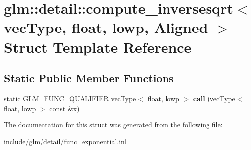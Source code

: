 \hypertarget{structglm_1_1detail_1_1compute__inversesqrt_3_01vecType_00_01float_00_01lowp_00_01Aligned_01_4}{}\section{glm\+:\+:detail\+:\+:compute\+\_\+inversesqrt$<$ vec\+Type, float, lowp, Aligned $>$ Struct Template Reference}
\label{structglm_1_1detail_1_1compute__inversesqrt_3_01vecType_00_01float_00_01lowp_00_01Aligned_01_4}
\subsection*{Static Public Member Functions}
\begin{DoxyCompactItemize}
\item 
\mbox{\label{structglm_1_1detail_1_1compute__inversesqrt_3_01vecType_00_01float_00_01lowp_00_01Aligned_01_4_ac10bd6d36d1b22d497cc0ab187fe22ed}} 
static G\+L\+M\+\_\+\+F\+U\+N\+C\+\_\+\+Q\+U\+A\+L\+I\+F\+I\+ER vec\+Type$<$ float, lowp $>$ {\bfseries call} (vec\+Type$<$ float, lowp $>$ const \&x)
\end{DoxyCompactItemize}


The documentation for this struct was generated from the following file\+:\begin{DoxyCompactItemize}
\item 
include/glm/detail/\hyperlink{func__exponential_8inl}{func\+\_\+exponential.\+inl}\end{DoxyCompactItemize}
